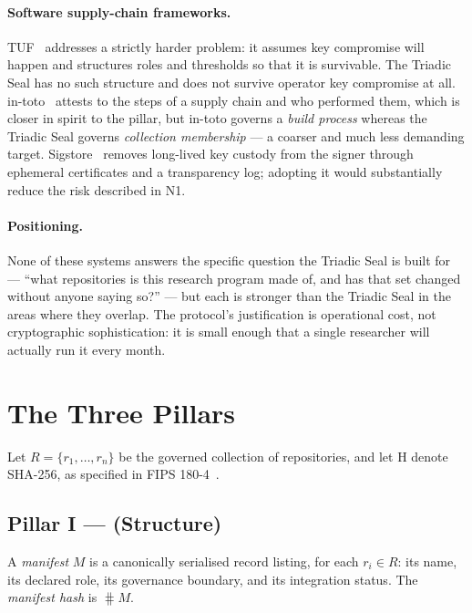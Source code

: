 \documentclass[11pt,a4paper]{article}
\begin{document}
\paragraph{Software supply-chain frameworks.}
TUF~\cite{tuf2010} addresses a strictly harder problem: it assumes key
compromise will happen and structures roles and thresholds so that it is
survivable. The Triadic Seal has no such structure and does not survive
operator key compromise at all. in-toto~\cite{intoto2019} attests to the
steps of a supply chain and who performed them, which is closer in spirit to
the \Signature{} pillar, but in-toto governs a \emph{build process} whereas
the Triadic Seal governs \emph{collection membership} --- a coarser and much
less demanding target. Sigstore~\cite{sigstore2022} removes long-lived key
custody from the signer through ephemeral certificates and a transparency
log; adopting it would substantially reduce the risk described in N1.

\paragraph{Positioning.}
None of these systems answers the specific question the Triadic Seal is built
for --- ``what repositories is this research program made of, and has that set
changed without anyone saying so?'' --- but each is stronger than the Triadic
Seal in the areas where they overlap. The protocol's justification is
operational cost, not cryptographic sophistication: it is small enough that a
single researcher will actually run it every month.

\section{The Three Pillars}
\label{sec:pillars}

Let $R = \{r_1,\dots,r_n\}$ be the governed collection of repositories, and
let $\mathrm{H}$ denote SHA-256, as specified in FIPS 180-4~\cite{fips180-4}.

\subsection{Pillar I --- \Manifest{} (Structure)}

\begin{definition}[Manifest]
\label{def:manifest}
A \emph{manifest} $M$ is a canonically serialised record listing, for each
$r_i \in R$: its name, its declared role, its governance boundary, and its
integration status. The \emph{manifest hash} is $\hash{M}$.
\end{definition}
\end{document}
